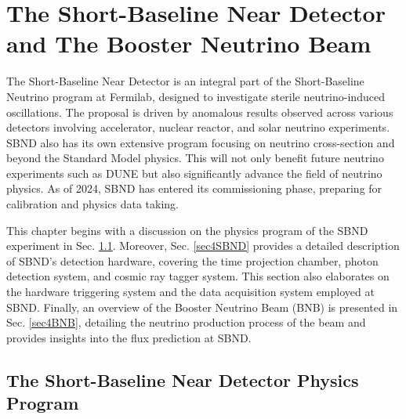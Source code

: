 \chapter{The Short-Baseline Near Detector and The Booster Neutrino Beam}

\ifpdf
    \graphicspath{{Chapter4/Figs/Raster/}{Chapter4/Figs/PDF/}{Chapter4/Figs/}}
\else
    \graphicspath{{Chapter4/Figs/Vector/}{Chapter4/Figs/}}
\fi


The Short-Baseline Near Detector is an integral part of the Short-Baseline Neutrino program at Fermilab, designed to investigate sterile neutrino-induced oscillations. 
The proposal is driven by anomalous results observed across various detectors involving accelerator, nuclear reactor, and solar neutrino experiments.
SBND also has its own extensive program focusing on neutrino cross-section and beyond the Standard Model physics. 
This will not only benefit future neutrino experiments such as DUNE but also significantly advance the field of neutrino physics.
As of 2024, SBND has entered its commissioning phase, preparing for calibration and physics data taking.

This chapter begins with a discussion on the physics program of the SBND experiment in Sec. \ref{sec4PhysicsProgram}. 
Moreover, Sec. \ref{sec4SBND} provides a detailed description of SBND's detection hardware, covering the time projection chamber, photon detection system, and cosmic ray tagger system. 
This section also elaborates on the hardware triggering system and the data acquisition system employed at SBND.
Finally, an overview of the Booster Neutrino Beam (BNB) is presented in Sec. \ref{sec4BNB}, detailing the neutrino production process of the beam and provides insights into the flux prediction at SBND.

\newpage
\section{The Short-Baseline Near Detector Physics Program}
\label{sec4PhysicsProgram}

